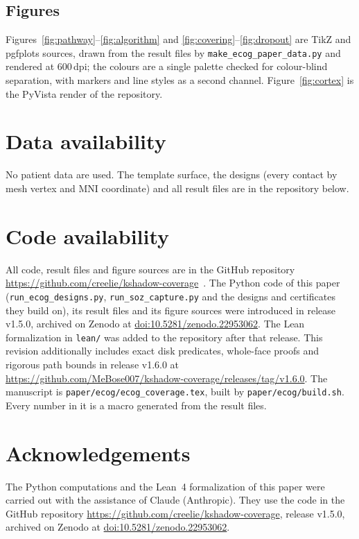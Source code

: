 \documentclass[11pt]{amsart}
\newcommand{\codeRepo}{\url{https://github.com/creelie/kshadow-coverage}}
\newcommand{\codeRelease}{v1.5.0}
\newcommand{\zenodoDOI}{10.5281/zenodo.22953062}
\theoremstyle{definition}
\theoremstyle{remark}
\begin{document}
\subsection*{Figures}
Figures~\ref{fig:pathway}--\ref{fig:algorithm} and
\ref{fig:covering}--\ref{fig:dropout} are TikZ and pgfplots sources, drawn from
the result files by \texttt{make\_ecog\_paper\_data.py} and rendered at
600\,dpi; the colours are a single palette checked for colour-blind
separation, with markers and line styles as a second channel.
Figure~\ref{fig:cortex} is the PyVista render of the repository.

\section*{Data availability}
No patient data are used. The template surface, the designs (every contact by
mesh vertex and MNI coordinate) and all result files are in the repository
below.

\section*{Code availability}
\begin{sloppypar}
All code, result files and figure sources are in the GitHub repository
\codeRepo~\cite{kshadowcode}. The Python code of this paper
(\texttt{run\_ecog\_designs.py}, \texttt{run\_soz\_capture.py} and the
designs and certificates they build on), its result files and its figure
sources were introduced in release \codeRelease, archived on Zenodo at
\href{https://doi.org/\zenodoDOI}{doi:\zenodoDOI}. The Lean formalization in
\texttt{lean/} was added to the repository after that release. This
revision additionally includes exact disk predicates, whole-face proofs and
rigorous path bounds in release v1.6.0 at
\url{https://github.com/MeBose007/kshadow-coverage/releases/tag/v1.6.0}.
The manuscript is \texttt{paper/ecog/ecog\_coverage.tex}, built by
\texttt{paper/ecog/build.sh}. Every number in it is a macro generated from the
result files.
\end{sloppypar}

\section*{Acknowledgements}
\begin{sloppypar}
The Python computations and the Lean~4 formalization of this paper were
carried out with the assistance of Claude (Anthropic). They use the code in
the GitHub repository \codeRepo{}, release \codeRelease{}, archived on Zenodo
at \href{https://doi.org/\zenodoDOI}{doi:\zenodoDOI}.
\end{sloppypar}
\end{document}
